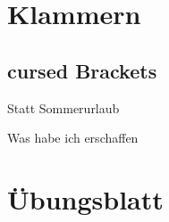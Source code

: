 \documentclass[aspectratio=169,usepdftitle=true,11pt,ngerman,t]{beamer}
\subtitle{Tutorium 4}
\date{09. Juni 2026}
\begin{document}
\section[\cb{&ao}, \cb{g==} und \cb{yzx}]{Klammern}

\subsection{\texorpdfstring{\textbf{c}ursed \textbf{B}rackets}{cursed Brackets}}
\begin{frame}{Statt Sommerurlaub}
\centering
\hspace*{-.5cm}\begin{minipage}{2\paperwidth}
\color{gray}

\end{minipage}\par
\vspace*{1cm}
\Large Was habe ich erschaffen
\end{frame}

\section[Nächste Woche dann sogar mal korrigiert!]{Übungsblatt}
\end{document}
